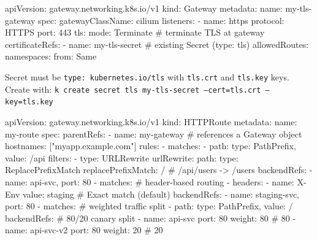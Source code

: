 \begin{tcbitemize}[
  raster columns=4, raster equal height=rows,
  blanker, cheat subtitle
]
\begin{tcbitemize}[
        raster columns=1, raster equal height=rows,
        blanker, cheat subtitle
      ]
        \begin{cheatcodebash}
        apiVersion: gateway.networking.k8s.io/v1
        kind: Gateway
        metadata: {name: my-tls-gateway}
        spec:
          gatewayClassName: cilium
          listeners:
          - name: https
            protocol: HTTPS
            port: 443
            tls:
              mode: Terminate            # terminate TLS at gateway
              certificateRefs:
              - name: my-tls-secret      # existing Secret (type: tls)
            allowedRoutes:
              namespaces: {from: Same}
        \end{cheatcodebash}
        {\fontsize{4.5}{5.5}\selectfont\sffamily\color{gray}%
        Secret must be \texttt{type: kubernetes.io/tls} with \texttt{tls.crt} and \texttt{tls.key} keys.
        Create with: \texttt{k create secret tls my-tls-secret --cert=tls.crt --key=tls.key}\par}

        \begin{cheatcodebash}
        apiVersion: gateway.networking.k8s.io/v1
        kind: HTTPRoute
        metadata: {name: my-route}
        spec:
          parentRefs:
            - name: my-gateway         # references a Gateway object
          hostnames: ["myapp.example.com"]
          rules:
            - matches:
                - path: {type: PathPrefix, value: /api}
              filters:
                - type: URLRewrite
                  urlRewrite:
                    path:
                      type: ReplacePrefixMatch
                      replacePrefixMatch: / # /api/users -> /users
              backendRefs:
                - {name: api-svc, port: 80}
            - matches:               # header-based routing
                - headers:
                  - name: X-Env
                    value: staging   # Exact match (default)
              backendRefs:
                - {name: staging-svc, port: 80}
            - matches:               # weighted traffic split
                - path: {type: PathPrefix, value: /}
              backendRefs:           # 80/20 canary split
                - name: api-svc
                  port: 80
                  weight: 80         # 80%
                - name: api-svc-v2
                  port: 80
                  weight: 20         # 20%
        \end{cheatcodebash}

    \end{tcbitemize}

\end{tcbitemize}

